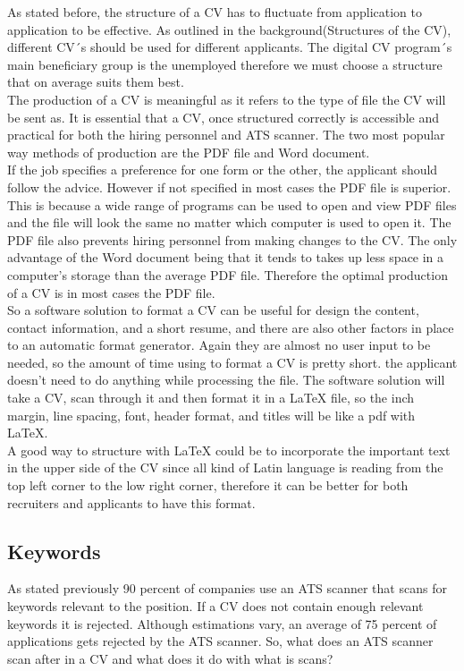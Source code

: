 As stated before, the structure of a CV has to fluctuate from application to application to be effective.
As outlined in the background(Structures of the CV), different CV´s should be used for different applicants.
The digital CV program´s main beneficiary group is the unemployed therefore we must choose a structure that on average suits them best. \\

The production of a CV is meaningful as it refers to the type of file the CV will be sent as.
It is essential that a CV, once structured correctly is accessible and practical for both the hiring personnel and ATS scanner.
The two most popular way methods of production are the PDF file and Word document. \\

If the job specifies a preference for one form or the other, the applicant should follow the advice.
However if not specified in most cases the PDF file is superior.
This is because a wide range of programs can be used to open and view PDF files and the file will look the same no matter which computer is used to open it.
The PDF file also prevents hiring personnel from making changes to the CV. 
The only advantage of the Word document being that it tends to takes up less space in a computer's storage than the average PDF file.
Therefore the optimal production of a CV is in most cases the PDF file. \\

So a software solution to format a CV can be useful for design the content, contact information, and a short resume,
and there are also other factors in place to an automatic format generator. Again they are almost no user input to be needed, 
so the amount of time using to format a CV is pretty short. 
the applicant doesn't need to do anything while processing the file. The software solution will take a CV, scan through it and
then format it in a LaTeX file, so the inch margin, line spacing, font, header format, and titles will be like a pdf with LaTeX.\\

A good way to structure with LaTeX could be to incorporate the important text in the upper side of the CV 
since all kind of Latin language is reading from the top left corner to the low right corner, therefore it can be better
for both recruiters and applicants to have this format\cite{Pdf_vs_word}.\\

\subsection{Keywords}
As stated previously 90 percent of companies use an ATS scanner that scans for keywords relevant to the position.
If a CV does not contain enough relevant keywords it is rejected. 
Although estimations vary, an average of 75 percent of applications gets rejected by the ATS scanner.
So, what does an ATS scanner scan after in a CV and what does it do with what is scans? \\

